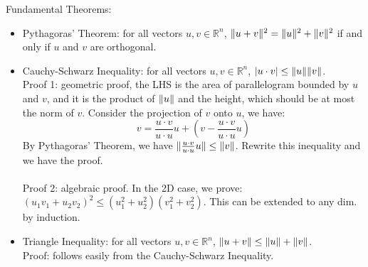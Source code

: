 \documentclass{report}
\begin{document}
Fundamental Theorems: 
\begin{itemize}
\item Pythagoras' Theorem: for all vectors $u,v \in \mathbb{R}^n$, $\lVert u+v\rVert^2 = \lVert u\rVert^2 + \lVert v\rVert^2$ if and only if $u$ and $v$ are orthogonal. 

\item Cauchy-Schwarz Inequality: for all vectors $u,v \in \mathbb{R}^n$, $|u \cdot v| \leq \lVert u\rVert \lVert v\rVert$. \\
Proof 1: geometric proof, the LHS is the area of parallelogram bounded by $u$ and $v$, and it is the product of $\lVert u\rVert$ and the height, which should be at most the norm of $v$. Consider the projection of $v$ onto $u$, we have: 
\begin{equation}
v = \frac{u \cdot v}{u \cdot u} u + \left(v - \frac{u \cdot v}{u \cdot u} u\right)
\end{equation}
By Pythagoras' Theorem, we have $\lVert\frac{u \cdot v}{u \cdot u} u\rVert \leq \lVert v\rVert$. Rewrite this inequality and we have the proof.\\
\\
Proof 2: algebraic proof. In the 2D case, we prove: $(u_1 v_1 + u_2 v_2)^2 \leq (u_1^2 + u_2^2) (v_1^2 + v_2^2)$. This can be extended to any dim. by induction.

\item Triangle Inequality: for all vectors $u,v \in \mathbb{R}^n$, $\lVert u + v\rVert \leq \lVert u\rVert + \lVert v\rVert$. \\
Proof: follows easily from the Cauchy-Schwarz Inequality. 
\end{itemize}
\end{document}
